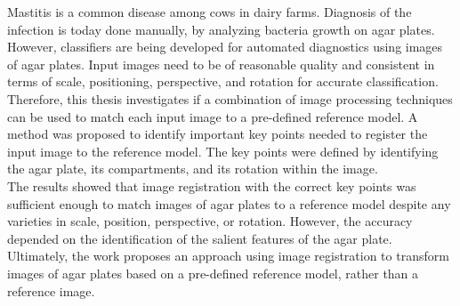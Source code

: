 \noindent Mastitis is a common disease among cows in dairy farms. Diagnosis of the infection is today done manually, by analyzing bacteria growth on agar plates. However, classifiers are being developed for automated diagnostics using images of agar plates. Input images need to be of reasonable quality and consistent in terms of scale, positioning, perspective, and rotation for accurate classification. Therefore, this thesis investigates if a combination of image processing techniques can be used to match each input image to a pre-defined reference model. A method was proposed to identify important key points needed to register the input image to the reference model. The key points were defined by identifying the agar plate, its compartments, and its rotation within the image. \\

\noindent The results showed that image registration with the correct key points was sufficient enough to match images of agar plates to a reference model despite any varieties in scale, position, perspective, or rotation. However, the accuracy depended on the identification of the salient features of the agar plate.  
Ultimately, the work proposes an approach using image registration to transform images of agar plates based on a pre-defined reference model, rather than a reference image. 

